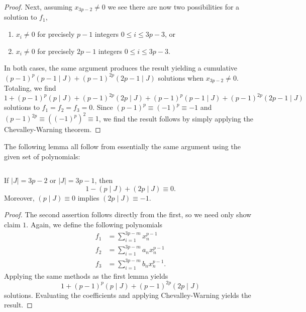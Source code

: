 \begin{proof}
	Next, assuming \(x_{3p-2} \neq 0\) we see there are now two possibilities for a solution to \(f_1\),
	\begin{enumerate}
		\item \(x_{i} \neq 0\) for precisely \(p-1\) integers \(0 \le i \le 3p-3\), or
		\item \(x_{i} \neq 0\) for precisely \(2p-1\) integers \(0 \le i \le 3p-3\).
	\end{enumerate}
	In both cases, the same argument produces the result yielding a cumulative \(\left( p-1 \right) ^{p} \left( p-1 \mid J \right)  + \left( p-1 \right) ^{2p}\left( 2p-1 \mid J \right) \) solutions when \(x_{3p-2} \neq 0\). Totaling, we find \[
		1 + \left( p-1 \right) ^{p} \left( p \mid J \right)  + \left( p-1 \right) ^{2p} \left( 2p \mid J \right)  + \left( p-1 \right) ^{p} \left( p-1 \mid J \right)  + \left( p-1 \right) ^{2p}\left( 2p-1 \mid J \right)
	\] solutions to \(f_1=f_2=f_3 = 0\). Since \(\left( p-1 \right) ^{p} \equiv \left( -1 \right) ^{p} \equiv -1\) and \(\left( p-1 \right) ^{2p} \equiv(\left( -1 \right) ^{p})^2 \equiv 1\), we find the result follows by simply applying the Chevalley-Warning theorem.
\end{proof}
The following lemma all follow from essentially the same argument using the given set of polynomials:
\begin{lemma}\(\label{Kemp 4}\)
	\begin{enumerate}
		If \(\left| J \right|  = 3p-2\) or \(\left| J \right|  = 3p-1\), then
			\begin{equation}
				1 - \left( p \mid J \right)  + \left( 2p \mid J \right)  \equiv 0.\label{Kem 4}
			\end{equation}
		Moreover, \(\left( p \mid J \right) \equiv 0 \) implies \(\left( 2p \mid J \right) \equiv -1\).
	\end{enumerate}
\end{lemma}
\begin{proof}
	The second assertion follows directly from the first, so we need only show claim \(1\). Again, we define the following polynomials
	\begin{align*}
		f_1 &= \sum_{i= 1}^{3p-m} x_{n}^{p-1}\\
f_2 &=  \sum_{i= 1}^{3p-m} a_{n} x_{n}^{p-1} \\
f_3 &=  \sum_{i= 1}^{3p-m} b_{n} x_{n}^{p-1}
	.\end{align*}
	Applying the same methods as the first lemma yields \[
		1 + \left( p-1 \right) ^{p} \left( p \mid J \right)  + \left( p-1 \right) ^{2p} \left(  2p \mid J \right)
	\] solutions. Evaluating the coefficients and applying Chevalley-Warning yields the result.
\end{proof}
